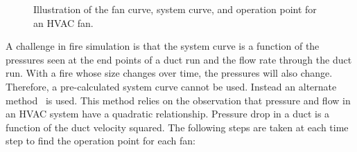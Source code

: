 \begin{figure}[ht!]
   \begin{center}
      \caption[Illustration of the fan curve, system curve, and operation point for an HVAC fan.]{\label{hvac_curves} Illustration of the fan curve, system curve, and operation point for an HVAC fan.}
   \end{center}
\end{figure}

A challenge in fire simulation is that the system curve is a function of the pressures seen at the end points of a duct run and the flow rate through the duct run. With a fire whose size changes over time, the pressures will also change. Therefore, a pre-calculated system curve cannot be used. Instead an alternate method~\cite{Ralph:2} is used. This method relies on the observation that pressure and flow in an HVAC system have a quadratic relationship. Pressure drop in a duct is a function of the duct velocity squared. The following steps are taken at each time step to find the operation point for each fan:

